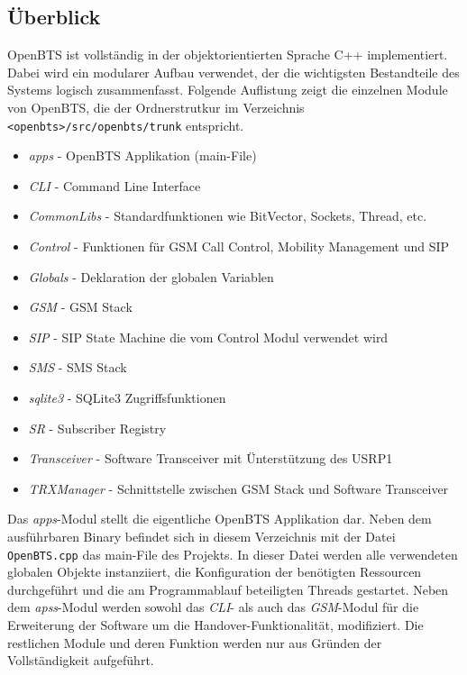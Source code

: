 \label{sec:swarch}

\subsection{Überblick}

OpenBTS ist vollständig in der objektorientierten Sprache C++ implementiert. Dabei wird ein modularer Aufbau verwendet, der die wichtigsten Bestandteile des Systems logisch zusammenfasst. Folgende Auflistung zeigt die einzelnen Module von OpenBTS, die der Ordnerstrutkur im Verzeichnis \lstinline{<openbts>/src/openbts/trunk} entspricht.

\begin{itemize}
 \item \textit{apps} - OpenBTS Applikation (main-File)
 \item \textit{CLI} - Command Line Interface
 \item \textit{CommonLibs} - Standardfunktionen wie BitVector, Sockets, Thread, etc.
 \item \textit{Control} - Funktionen für GSM Call Control, Mobility Management und SIP
 \item \textit{Globals} - Deklaration der globalen Variablen
 \item \textit{GSM} - GSM Stack
 \item \textit{SIP} - SIP State Machine die vom Control Modul verwendet wird
 \item \textit{SMS} - SMS Stack
 \item \textit{sqlite3} - SQLite3 Zugriffsfunktionen
 \item \textit{SR} - Subscriber Registry
 \item \textit{Transceiver} - Software Transceiver mit Ünterstützung des USRP1
 \item \textit{TRXManager} - Schnittstelle zwischen GSM Stack und Software Transceiver
\end{itemize}

Das \textit{apps}-Modul stellt die eigentliche OpenBTS Applikation dar. Neben dem ausführbaren Binary befindet sich in diesem Verzeichnis mit der Datei \lstinline{OpenBTS.cpp} das main-File des Projekts. In dieser Datei werden alle verwendeten globalen Objekte instanziiert, die Konfiguration der benötigten Ressourcen durchgeführt und die am Programmablauf beteiligten Threads gestartet. Neben dem \textit{apss}-Modul werden sowohl das \textit{CLI}- als auch das \textit{GSM}-Modul für die Erweiterung der Software um die Handover-Funktionalität, modifiziert. Die restlichen Module und deren Funktion werden nur aus Gründen der Vollständigkeit aufgeführt.

